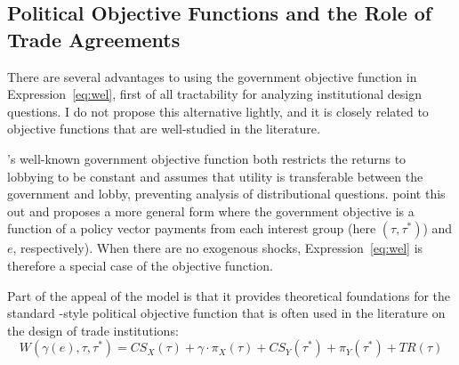 \documentclass[12pt]{article}
\newtheorem{assumption}{Assumption}
\newcommand{\ve}{\theta}
\newcommand{\ga}{\gamma}
\begin{document}





\subsection{Political Objective Functions and the Role of Trade Agreements}
\label{sec:objfcn}
There are several advantages to using the government objective function in Expression~\ref{eq:wel}, first of all tractability for analyzing institutional design questions. I do not propose this alternative lightly, and it is closely related to objective functions that are well-studied in the literature.

\Textcite{gh94}'s well-known government objective function both restricts the returns to lobbying to be constant and assumes that utility is transferable between the government and lobby, preventing analysis of distributional questions. \Textcite{dgh97} point this out and proposes a more general form where the government objective is a function of a policy vector payments from each interest group (here $\left(\tau,\tau^*\right)$) and $e$, respectively). When there are no exogenous shocks, Expression~\ref{eq:wel} is therefore a special case of the \Textcite{dgh97} objective function.

Part of the appeal of the \Textcite{gh94} model is that it provides theoretical foundations for the standard \Textcite{baldwin}-style political objective function that is often used in the literature on the design of trade institutions:
\begin{equation}
  W(\ga(e),\tau,\tau^*) = \mathit{CS}_X(\tau) + \ga \cdot \pi_X(\tau) + \mathit{CS}_Y(\tau^*) + \pi_Y(\tau^*) + \mathit{TR}(\tau)
  \label{eq:baldwin}
\end{equation}
\end{document}

